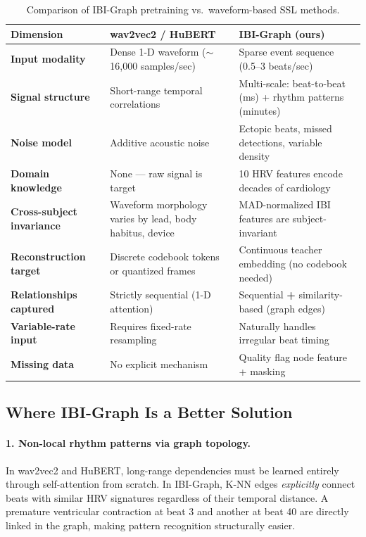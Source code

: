 \documentclass[11pt,a4paper]{article}
\begin{document}
\begin{table}[h!]
\centering
\renewcommand{\arraystretch}{1.4}
\begin{tabular}{>{\bfseries}p{3.2cm} p{5.5cm} p{5.5cm}}
\toprule
Dimension & wav2vec2 / HuBERT & IBI-Graph (ours) \\
\midrule
Input modality
    & Dense 1-D waveform ($\sim$16{,}000 samples/sec)
    & Sparse event sequence (0.5--3 beats/sec) \\
Signal structure
    & Short-range temporal correlations
    & Multi-scale: beat-to-beat (ms) + rhythm patterns (minutes) \\
Noise model
    & Additive acoustic noise
    & Ectopic beats, missed detections, variable density \\
Domain knowledge
    & None --- raw signal is target
    & 10 HRV features encode decades of cardiology \\
Cross-subject invariance
    & Waveform morphology varies by lead, body habitus, device
    & MAD-normalized IBI features are subject-invariant \\
Reconstruction target
    & Discrete codebook tokens or quantized frames
    & Continuous teacher embedding (no codebook needed) \\
Relationships captured
    & Strictly sequential (1-D attention)
    & Sequential \textbf{+} similarity-based (graph edges) \\
Variable-rate input
    & Requires fixed-rate resampling
    & Naturally handles irregular beat timing \\
Missing data
    & No explicit mechanism
    & Quality flag node feature + masking \\
\bottomrule
\end{tabular}
\caption{Comparison of IBI-Graph pretraining vs.\ waveform-based SSL methods.}
\end{table}

\subsection{Where IBI-Graph Is a Better Solution}

\paragraph{1. Non-local rhythm patterns via graph topology.}
In wav2vec2 and HuBERT, long-range dependencies must be learned entirely through self-attention from scratch.
In IBI-Graph, K-NN edges \emph{explicitly} connect beats with similar HRV signatures regardless of their
temporal distance. A premature ventricular contraction at beat 3 and another at beat 40 are directly linked
in the graph, making pattern recognition structurally easier.
\end{document}
